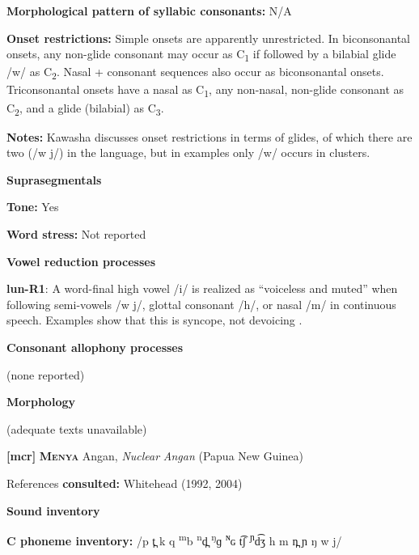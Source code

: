 \textbf{Morphological pattern of syllabic consonants:} N/A



\textbf{Onset restrictions:} Simple onsets are apparently unrestricted. In biconsonantal onsets, any non-glide consonant may occur as C\textsubscript{1} if followed by a bilabial glide /w/ as C\textsubscript{2}. Nasal + consonant sequences also occur as biconsonantal onsets. Triconsonantal onsets have a nasal as C\textsubscript{1}, any non-nasal, non-glide consonant as C\textsubscript{2}, and a glide (bilabial) as C\textsubscript{3}.



\textbf{Notes:} Kawasha discusses onset restrictions in terms of glides, of which there are two (/w j/) in the language, but in examples only /w/ occurs in clusters.



\textbf{Suprasegmentals}



\textbf{Tone:} Yes



\textbf{Word stress:} Not reported



\textbf{Vowel reduction processes}



\textbf{lun-R1}: A word-final high vowel /i/ is realized as “voiceless and muted” when following semi-vowels /w j/, glottal consonant /h/, or nasal /m/ in continuous speech. Examples show that this is syncope, not devoicing \citep[37-8]{Kawasha2003}.



\textbf{Consonant allophony processes}



(none reported)



\textbf{Morphology}



(adequate texts unavailable)



\textbf{[mcr]}   \textbf{\textsc{Menya}}    Angan, \textit{Nuclear} \textit{Angan} (Papua New Guinea)



References \textbf{consulted:} Whitehead (1992, 2004)



\textbf{Sound inventory}



\textbf{C phoneme inventory:} /p t̪ k q \textsuperscript{m}b \textsuperscript{n}d̪ \textsuperscript{ŋ}ɡ \textsuperscript{ɴ}ɢ t͡ʃ \textsuperscript{ɲ}d͡ʒ h m n̪ ɲ ŋ w j/



